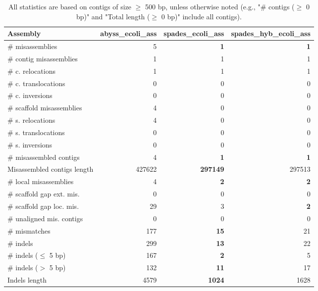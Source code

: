 \documentclass[12pt,a4paper]{article}
\begin{document}
\begin{table}[ht]
\begin{center}
\caption{All statistics are based on contigs of size $\geq$ 500 bp, unless otherwise noted (e.g., "\# contigs ($\geq$ 0 bp)" and "Total length ($\geq$ 0 bp)" include all contigs).}
\begin{tabular}{|l*{3}{|r}|}
\hline
Assembly & abyss\_ecoli\_ass & spades\_ecoli\_ass & spades\_hyb\_ecoli\_ass \\ \hline
\# misassemblies & 5 & {\bf 1} & {\bf 1} \\ \hline
\hspace{2mm}\# contig misassemblies & 1 & 1 & 1 \\ \hline
\hspace{5mm}\# c. relocations & 1 & 1 & 1 \\ \hline
\hspace{5mm}\# c. translocations & 0 & 0 & 0 \\ \hline
\hspace{5mm}\# c. inversions & 0 & 0 & 0 \\ \hline
\hspace{2mm}\# scaffold misassemblies & 4 & 0 & 0 \\ \hline
\hspace{5mm}\# s. relocations & 4 & 0 & 0 \\ \hline
\hspace{5mm}\# s. translocations & 0 & 0 & 0 \\ \hline
\hspace{5mm}\# s. inversions & 0 & 0 & 0 \\ \hline
\# misassembled contigs & 4 & {\bf 1} & {\bf 1} \\ \hline
Misassembled contigs length & 427622 & {\bf 297149} & 297513 \\ \hline
\# local misassemblies & 4 & {\bf 2} & {\bf 2} \\ \hline
\# scaffold gap ext. mis. & 0 & 0 & 0 \\ \hline
\# scaffold gap loc. mis. & 29 & 3 & {\bf 2} \\ \hline
\# unaligned mis. contigs & 0 & 0 & 0 \\ \hline
\# mismatches & 177 & {\bf 15} & 21 \\ \hline
\# indels & 299 & {\bf 13} & 22 \\ \hline
\hspace{5mm}\# indels ($\leq$ 5 bp) & 167 & {\bf 2} & 5 \\ \hline
\hspace{5mm}\# indels ($>$ 5 bp) & 132 & {\bf 11} & 17 \\ \hline
Indels length & 4579 & {\bf 1024} & 1628 \\ \hline
\end{tabular}
\end{center}
\end{table}
\end{document}
